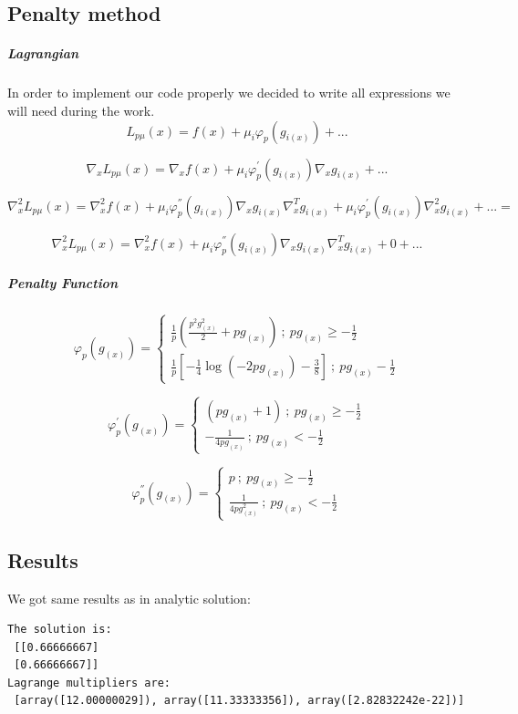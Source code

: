 \documentclass[12pt]{article}
\begin{document}
\subsection{Penalty method}
\subparagraph{Lagrangian} In order to implement our code properly we decided to write all expressions we will need during the work.
\[L_{p\mu}(x) = f(x) + \mu_i \varphi_{p }(g_{i(x)}) + ... \]

\[\nabla_x L_{p\mu}(x) = \nabla_x f(x) + \mu_i \varphi_{p }^{'} (g_{i(x)}) \nabla_x g_{i(x)} + ... \]

\[\nabla_x^2 L_{p\mu}(x) = \nabla_x^2 f(x) +  \mu_i \varphi_{p}^{''} (g_{i(x)}) \nabla_x g_{i(x)}\nabla_x^T g_{i(x)} +  \mu_i \varphi_{p}^{'} (g_{i(x)}) \nabla_x^2 g_{i(x)} + ... = \]

\[\nabla_x^2 L_{p\mu}(x) = \nabla_x^2 f(x) +  \mu_i \varphi_{p}^{''} (g_{i(x)}) \nabla_x g_{i(x)}\nabla_x^T g_{i(x)} + 0 + ... \]

\subparagraph{Penalty Function}
\[
    \varphi_{p}(g_{(x)}) =\left\{
                \begin{array}{ll}
                  \frac{1}{p}(\frac{p^2 g_{(x)}^2}{2} + pg_{(x)}) \ ; \ pg_{(x)} \geq -\frac{1}{2} \\
                  \frac{1}{p} [-\frac{1}{4} \log(-2pg_{(x)})-\frac{3}{8}] \ ; \ pg_{(x)} -\frac{1}{2}
                \end{array}
              \right.
\]

\[
    \varphi_{p}^{'}(g_{(x)}) =\left\{
                \begin{array}{ll}
                  (pg_{(x)}+1) \ ; \ pg_{(x)} \geq -\frac{1}{2} \\
				-\frac{1}{4pg_{(x)}}\ ; \ pg_{(x)} < -\frac{1}{2}
                \end{array}
              \right.
\]

\[
    \varphi_{p}^{''}(g_{(x)}) =\left\{
                \begin{array}{ll}
                   p \ ; \ pg_{(x)} \geq -\frac{1}{2} \\
				\frac{1}{4pg_{(x)}^2}\ ; \ pg_{(x)} < -\frac{1}{2}
                \end{array}
              \right.
\]

\subsection{Results}
We got same results as in analytic solution:
\begin{verbatim}
The solution is:
 [[0.66666667]
 [0.66666667]]
Lagrange multipliers are:
 [array([12.00000029]), array([11.33333356]), array([2.82832242e-22])]
\end{verbatim}
\end{document}

